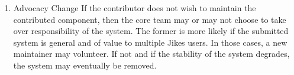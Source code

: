 \begin{enumerate}
\item{Advocacy Change}  
If the contributor does not wish to maintain the contributed
component, then the core team may or may not choose to take over
responsibility of the system.  The former is more likely if the
submitted system is general and of value to multiple Jikes users.  
In those cases, a new maintainer may volunteer.  If not and if the
stability of the system degrades, the system may eventually be
removed.

\end{enumerate}